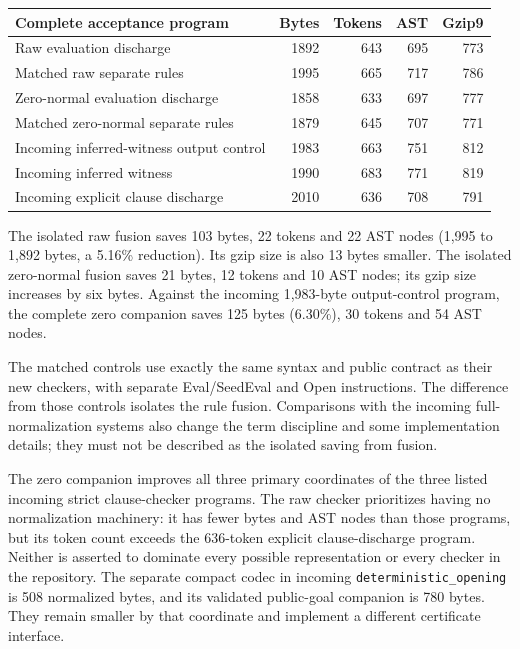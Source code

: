 \begin{center}\small
\begin{tabularx}{\textwidth}{@{}Xrrrr@{}}
\toprule
Complete acceptance program & Bytes & Tokens & AST & Gzip9\\
\midrule
Raw evaluation discharge & 1892 & 643 & 695 & 773\\
Matched raw separate rules & 1995 & 665 & 717 & 786\\
Zero-normal evaluation discharge & 1858 & 633 & 697 & 777\\
Matched zero-normal separate rules & 1879 & 645 & 707 & 771\\
Incoming inferred-witness output control & 1983 & 663 & 751 & 812\\
Incoming inferred witness & 1990 & 683 & 771 & 819\\
Incoming explicit clause discharge & 2010 & 636 & 708 & 791\\
\bottomrule
\end{tabularx}
\end{center}

The isolated raw fusion saves 103 bytes, 22 tokens and 22 AST nodes
(1,995 to 1,892 bytes, a 5.16\% reduction). Its gzip size is also 13 bytes
smaller. The isolated zero-normal fusion saves 21 bytes, 12 tokens and
10 AST nodes; its gzip size increases by six bytes. Against the incoming
1,983-byte output-control program, the complete zero companion saves
125 bytes (6.30\%), 30 tokens and 54 AST nodes.


The matched controls use exactly the same syntax and public contract as
their new checkers, with separate Eval/SeedEval and Open instructions.
The difference from those controls isolates the rule fusion. Comparisons
with the incoming full-normalization systems also change the term
discipline and some implementation details; they must not be described as
the isolated saving from fusion.

The zero companion improves all three primary coordinates of the three
listed incoming strict clause-checker programs. The raw checker prioritizes
having no normalization machinery: it has fewer bytes and AST nodes than
those programs, but its token count exceeds the 636-token explicit
clause-discharge program. Neither is asserted to dominate every possible
representation or every checker in the repository. The separate compact
codec in incoming \texttt{deterministic\_opening} is 508 normalized bytes,
and its validated public-goal companion is 780 bytes. They remain smaller
by that coordinate and implement a different certificate interface.

